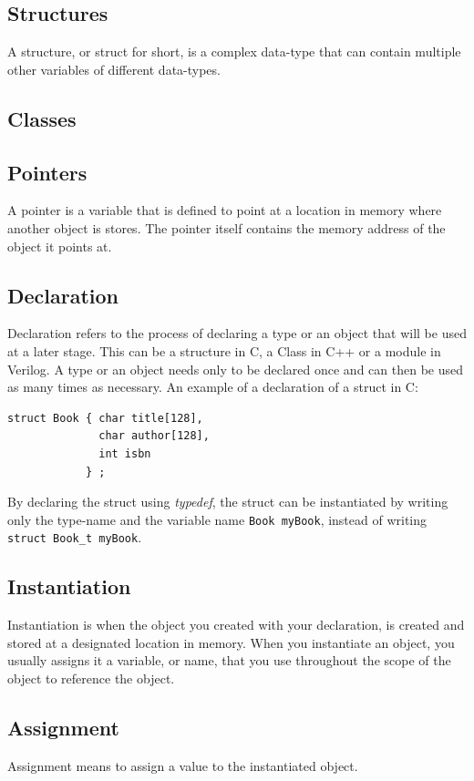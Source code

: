 \subsection{Structures}
A structure, or struct for short, is a complex data-type that can contain multiple other variables of different data-types. 
\subsection{Classes}

\subsection{Pointers}
A pointer is a variable that is defined to point at a location in memory where another object is stores. The pointer itself contains the memory address of the object it points at.
\subsection{Declaration}
Declaration refers to the process of declaring a type or an object that will be used at a later stage. This can be a structure in C, a Class in C++ or a module in Verilog. A type or an object needs only to be declared once and can then be used as many times as necessary. An example of a declaration of a struct in C: 
\lstset{language=C++, style=Cstyle}
\begin{lstlisting}
struct Book { char title[128], 
              char author[128], 
              int isbn 
            } ;
\end{lstlisting}
By declaring the struct using \textit{typedef}, the struct can be instantiated by writing only the type-name and the variable name \verb!Book myBook!, instead of writing \verb!struct Book_t myBook!.
\subsection{Instantiation}
Instantiation is when the object you created with your declaration, is created and stored at a designated location in memory. When you instantiate an object, you usually assigns it a variable, or name, that you use throughout the scope of the object to reference the object.
\subsection{Assignment}
Assignment means to assign a value to the instantiated object.

